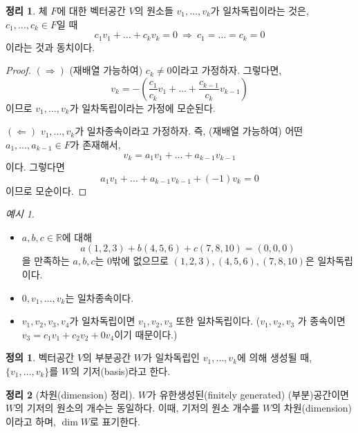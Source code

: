 \documentclass[unfonts,oneside,a4paper]{oblivoir}
\theoremstyle{definition}
\newtheorem{definition}{정의}[section]
\theoremstyle{theorem}
\newtheorem{theorem}{정리}[section]
\theoremstyle{theorem}
\theoremstyle{remark}
\theoremstyle{remark}
\theoremstyle{remark}
\newtheorem*{example}{예시}
\theoremstyle{remark}
\renewcommand{\vec}[1]{\bm{\mathit{#1}}}
\newcommand{\vecz}{\bm{\mathrm{0}}}
\begin{document}
\begin{theorem}
    체 $F$에 대한 벡터공간 $V$의 원소들 $\vec v_1, \dots, \vec v_k$가 일차독립이라는 것은, $c_1, \dots, c_k \in F$일 때
    \[
        c_1 \vec v_1 + \dots + c_k \vec v_k = \vecz\ \Rightarrow\ c_1 = \dots = c_k = 0
    \]
    이라는 것과 동치이다.
\end{theorem}

\begin{proof}
    $(\Rightarrow)$ (재배열 가능하여) $c_k \neq 0$이라고 가정하자.
    그렇다면,
    \[
        \vec v_k = - \left(\frac{c_1}{c_k} \vec v_1 + \dots + \frac{c_{k - 1}}{c_k} \vec v_{k - 1}\right)
    \]
    이므로 $\vec v_1, \dots, \vec v_k$가 일차독립이라는 가정에 모순된다.

    $(\Leftarrow)$ $\vec v_1, \dots, \vec v_k$가 일차종속이라고 가정하자.
    즉, (재배열 가능하여) 어떤 $a_1, \dots, a_{k - 1} \in F$가 존재해서,
    \[
        \vec v_k = a_1 \vec v_1 + \dots + a_{k - 1} \vec v_{k - 1}
    \]
    이다.
    그렇다면
    \[
        a_1 \vec v_1 + \dots + a_{k - 1} \vec v_{k - 1} + (-1) \vec v_k = \vecz
    \]
    이므로 모순이다.
\end{proof}

\begin{example}
    \leavevmode
    \begin{itemize}
        \item $a, b, c \in \mathbb R$에 대해
            \[
                a(1, 2, 3) + b(4, 5, 6) + c(7, 8, 10) = (0, 0, 0)
            \]
            을 만족하는 $a, b, c$는 0밖에 없으므로 $(1, 2, 3), (4, 5, 6), (7, 8, 10)$은 일차독립이다.
        \item $\vecz, \vec v_1, \dots, \vec v_k$는 일차종속이다.
        \item $\vec v_1, \vec v_2, \vec v_3, \vec v_4$가 일차독립이면 $\vec v_1, \vec v_2, \vec v_3$ 또한 일차독립이다.
            ($\vec v_1, \vec v_2, \vec v_3$ 가 종속이면 $\vec v_3 = c_1 \vec v_1 + c_2 \vec v_2 + 0 \vec v_4$이기 때문이다.)
    \end{itemize}
\end{example}

\begin{definition}
    벡터공간 $V$의 부분공간 $W$가 일차독립인 $\vec v_1, \dots, \vec v_k$에 의해 생성될 때, $\{ \vec v_1, \dots, \vec v_k\}$를 $W$의 기저(basis)라고 한다.
\end{definition}

\begin{theorem}[차원(dimension) 정리] \label{thm:dimension}
    $W$가 유한생성된(finitely generated) (부분)공간이면 $W$의 기저의 원소의 개수는 동일하다.
    이때, 기저의 원소 개수를 $W$의 차원(dimension)이라고 하며, $\dim W$로 표기한다.
\end{theorem}
\end{document}
